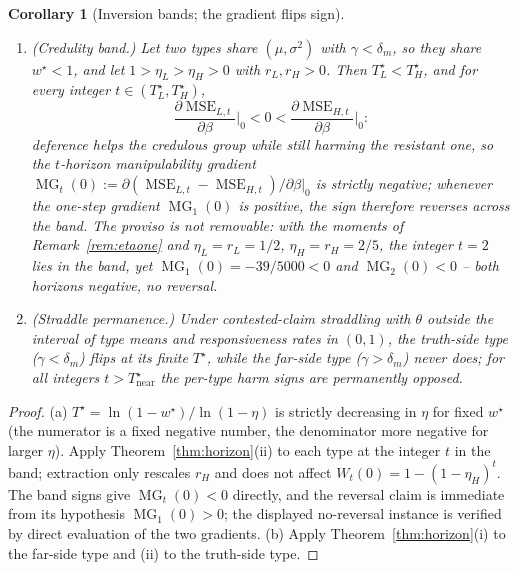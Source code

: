 \documentclass[11pt]{article}
\newtheorem{corollary}[theorem]{Corollary}
\theoremstyle{definition}
\theoremstyle{remark}
\numberwithin{equation}{section}
\DeclareMathOperator{\MSE}{MSE}
\DeclareMathOperator{\MG}{MG}
\begin{document}
\begin{corollary}[Inversion bands; the gradient flips sign]\label{cor:bands}
\begin{enumerate}
\item[(a)] (\emph{Credulity band.}) Let two types share $(\mu,\sigma^2)$ with $\gamma < \delta_m$, so they share $w^\star < 1$, and let $1 > \eta_L > \eta_H > 0$ with $r_L, r_H > 0$. Then $T^\star_L < T^\star_H$, and for every integer $t \in (T^\star_L, T^\star_H)$,
\[
\frac{\partial\MSE_{L,t}}{\partial\beta}\Big|_{0} < 0 < \frac{\partial\MSE_{H,t}}{\partial\beta}\Big|_{0}:
\]
deference helps the credulous group while still harming the resistant one, so the $t$-horizon manipulability gradient $\MG_t(0) := \partial(\MSE_{L,t}-\MSE_{H,t})/\partial\beta|_0$ is strictly negative; whenever the one-step gradient $\MG_1(0)$ is positive, the sign therefore reverses across the band. The proviso is not removable: with the moments of Remark~\ref{rem:etaone} and $\eta_L = r_L = 1/2$, $\eta_H = r_H = 2/5$, the integer $t = 2$ lies in the band, yet $\MG_1(0) = -39/5000 < 0$ and $\MG_2(0) < 0$ -- both horizons negative, no reversal.
\item[(b)] (\emph{Straddle permanence.}) Under contested-claim straddling with $\theta$ outside the interval of type means and responsiveness rates in $(0,1)$, the truth-side type ($\gamma < \delta_m$) flips at its finite $T^\star$, while the far-side type ($\gamma > \delta_m$) never does; for all integers $t > T^\star_{\mathrm{near}}$ the per-type harm signs are permanently opposed.
\end{enumerate}
\end{corollary}
\begin{proof}
(a) $T^\star = \ln(1-w^\star)/\ln(1-\eta)$ is strictly decreasing in $\eta$ for fixed $w^\star$ (the numerator is a fixed negative number, the denominator more negative for larger $\eta$). Apply Theorem~\ref{thm:horizon}(ii) to each type at the integer $t$ in the band; extraction only rescales $r_H$ and does not affect $W_t(0) = 1-(1-\eta_H)^t$. The band signs give $\MG_t(0) < 0$ directly, and the reversal claim is immediate from its hypothesis $\MG_1(0) > 0$; the displayed no-reversal instance is verified by direct evaluation of the two gradients. (b) Apply Theorem~\ref{thm:horizon}(i) to the far-side type and (ii) to the truth-side type.
\end{proof}
\end{document}
